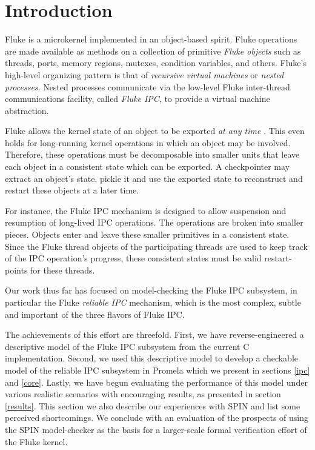 
\section{Introduction}
\label{intro}


Fluke is a microkernel implemented in an object-based spirit.
Fluke operations are made available as methods on a collection of
primitive {\it Fluke objects} such as threads, ports, memory regions,
mutexes, condition variables, and others.  Fluke's high-level organizing
pattern is that of {\em recursive virtual machines\/}
or {\em nested processes\/}\cite{ford+:osdi96}. Nested processes  
communicate via the low-level Fluke inter-thread communications facility, 
called {\it Fluke IPC}, to provide a virtual machine abstraction.

Fluke allows the kernel state of an object to be exported {\em at any time}
\cite{Tullmann+:iwooos96}. This even holds for long-running kernel operations
in which an object may be involved. Therefore, these operations must
be decomposable into smaller units that leave each object in a
consistent state which can be exported. A checkpointer may extract
an object's state, pickle it and use the exported state to reconstruct
and restart these objects at a later time.

For instance, the Fluke IPC mechanism is designed to allow suspension 
and resumption of long-lived IPC operations.  The operations are broken
into smaller pieces. Objects enter and leave these smaller primitives
in a consistent state. Since the Fluke thread objects of the participating
threads are used to keep track of the IPC operation's progress, 
these consistent states must be valid restart-points for these threads.

Our work thus far has focused on model-checking the Fluke IPC subsystem,
in particular the Fluke {\it reliable IPC} mechanism, which is the most
complex, subtle and important of the three flavors of Fluke IPC.

The achievements of this effort are threefold.  First, we have
reverse-engineered a descriptive model of the Fluke IPC subsystem from
the current C implementation.  Second, we used this descriptive 
model to develop a checkable model of the reliable IPC subsystem in
Promela \cite{Spin-book} which we present in sections \ref{ipc} and
\ref{core}.  Lastly, we have begun evaluating the performance of this
model under various realistic scenarios with encouraging results, as
presented in section \ref{results}.  This section we also
describe our experiences with SPIN and list some perceived shortcomings.
We conclude with an evaluation of the prospects of using
the SPIN model-checker as the basis for a larger-scale formal
verification effort of the Fluke kernel.

